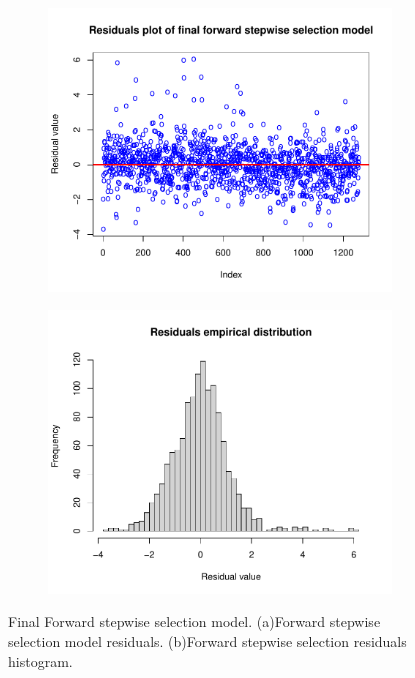 \begin{figure}[H]
	\centering
	\begin{subfigure}{.6\textwidth}
		\centering
		\includegraphics[width=0.6\linewidth]{ImageFiles/Regression/Forward/ForwardFinalModelResiduals}
		\caption{}
		\label{fig:ForwardFinalModelResiduals}
	\end{subfigure}%
	\begin{subfigure}{.6\textwidth}
		\centering
		\includegraphics[width=0.6\linewidth]{ImageFiles/Regression/Forward/ForwardFinalModelResidualsDist}
		\caption{}
		\label{fig:ForwardFinalModelResidualsDist}
	\end{subfigure}
	\caption{Final Forward stepwise selection model. (a)Forward stepwise selection model residuals. (b)Forward stepwise selection residuals histogram.}
	\label{fig:FinalFSSM}
\end{figure}

